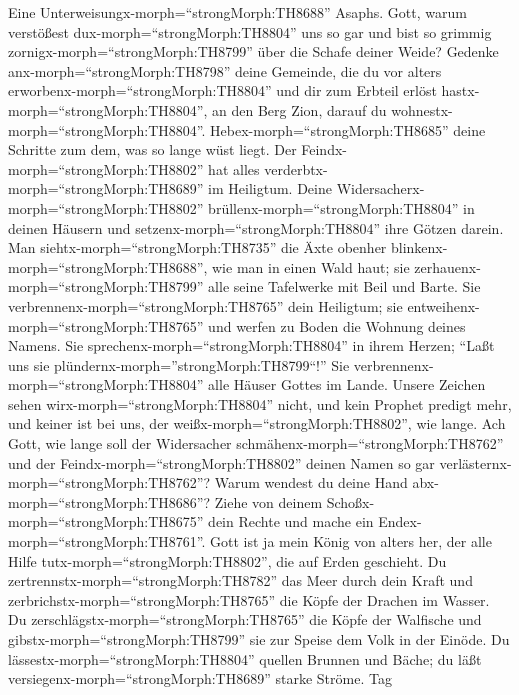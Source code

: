  Eine Unterweisungx-morph=``strongMorph:TH8688'' Asaphs.
Gott, warum verstößest dux-morph=``strongMorph:TH8804'' uns so gar und
bist so grimmig zornigx-morph=``strongMorph:TH8799'' über die Schafe
deiner Weide?  Gedenke anx-morph=``strongMorph:TH8798''
deine Gemeinde, die du vor alters erworbenx-morph=``strongMorph:TH8804''
und dir zum Erbteil erlöst hastx-morph=``strongMorph:TH8804'', an den
Berg Zion, darauf du wohnestx-morph=``strongMorph:TH8804''. 
Hebex-morph=``strongMorph:TH8685'' deine Schritte zum dem, was so lange
wüst liegt. Der Feindx-morph=``strongMorph:TH8802'' hat alles
verderbtx-morph=``strongMorph:TH8689'' im Heiligtum.  Deine
Widersacherx-morph=``strongMorph:TH8802''
brüllenx-morph=``strongMorph:TH8804'' in deinen Häusern und
setzenx-morph=``strongMorph:TH8804'' ihre Götzen darein. 
Man siehtx-morph=``strongMorph:TH8735'' die Äxte obenher
blinkenx-morph=``strongMorph:TH8688'', wie man in einen Wald haut;
 sie zerhauenx-morph=``strongMorph:TH8799'' alle seine
Tafelwerke mit Beil und Barte.  Sie
verbrennenx-morph=``strongMorph:TH8765'' dein Heiligtum; sie
entweihenx-morph=``strongMorph:TH8765'' und werfen zu Boden die Wohnung
deines Namens.  Sie sprechenx-morph=``strongMorph:TH8804''
in ihrem Herzen; ``Laßt uns sie
plündernx-morph=''strongMorph:TH8799``!'' Sie
verbrennenx-morph=``strongMorph:TH8804'' alle Häuser Gottes im Lande.
 Unsere Zeichen sehen wirx-morph=``strongMorph:TH8804''
nicht, und kein Prophet predigt mehr, und keiner ist bei uns, der
weißx-morph=``strongMorph:TH8802'', wie lange.  Ach Gott,
wie lange soll der Widersacher schmähenx-morph=``strongMorph:TH8762''
und der Feindx-morph=``strongMorph:TH8802'' deinen Namen so gar
verlästernx-morph=``strongMorph:TH8762''?  Warum wendest du
deine Hand abx-morph=``strongMorph:TH8686''? Ziehe von deinem
Schoßx-morph=``strongMorph:TH8675'' dein Rechte und mache ein
Endex-morph=``strongMorph:TH8761''.  Gott ist ja mein König
von alters her, der alle Hilfe tutx-morph=``strongMorph:TH8802'', die
auf Erden geschieht.  Du
zertrennstx-morph=``strongMorph:TH8782'' das Meer durch dein Kraft und
zerbrichstx-morph=``strongMorph:TH8765'' die Köpfe der Drachen im
Wasser.  Du zerschlägstx-morph=``strongMorph:TH8765'' die
Köpfe der Walfische und gibstx-morph=``strongMorph:TH8799'' sie zur
Speise dem Volk in der Einöde.  Du
lässestx-morph=``strongMorph:TH8804'' quellen Brunnen und Bäche; du läßt
versiegenx-morph=``strongMorph:TH8689'' starke Ströme.  Tag
